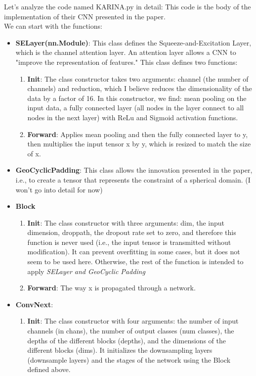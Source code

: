Let's analyze the code named KARINA.py in detail:
This code is the body of the implementation of their CNN presented in the paper.\\

We can start with the functions:\\

\begin{itemize}
\item \textbf{SELayer(nn.Module)}: This class defines the Squeeze-and-Excitation Layer, which is the channel attention layer. An attention layer allows a CNN to "improve the representation of features." This class defines two functions:
\begin{enumerate}
\item \textbf{Init}: The class constructor takes two arguments: channel (the number of channels) and reduction, which I believe reduces the dimensionality of the data by a factor of 16. In this constructor, we find: mean pooling on the input data, a fully connected layer (all nodes in the layer connect to all nodes in the next layer) with ReLu and Sigmoid activation functions.
\item \textbf{Forward}: Applies mean pooling and then the fully connected layer to y, then multiplies the input tensor x by y, which is resized to match the size of x.
\end{enumerate}
\item \textbf{GeoCyclicPadding}: This class allows the innovation presented in the paper, i.e., to create a tensor that represents the constraint of a spherical domain. (I won't go into detail for now)
\item \textbf{Block}
\begin{enumerate}
\item \textbf{Init}: The class constructor with three arguments: dim, the input dimension, droppath, the dropout rate set to zero, and therefore this function is never used (i.e., the input tensor is transmitted without modification). It can prevent overfitting in some cases, but it does not seem to be used here. Otherwise, the rest of the function is intended to apply \textit{SELayer and GeoCyclic Padding}
\item \textbf{Forward}: The way x is propagated through a network.
\end{enumerate}
\item \textbf{ConvNext}:
\begin{enumerate}
\item \textbf{Init}: The class constructor with four arguments: the number of input channels (in chans), the number of output classes (num classes), the depths of the different blocks (depths), and the dimensions of the different blocks (dims). It initializes the downsampling layers (downsample layers) and the stages of the network using the Block defined above.

\end{enumerate}
\end{itemize}
